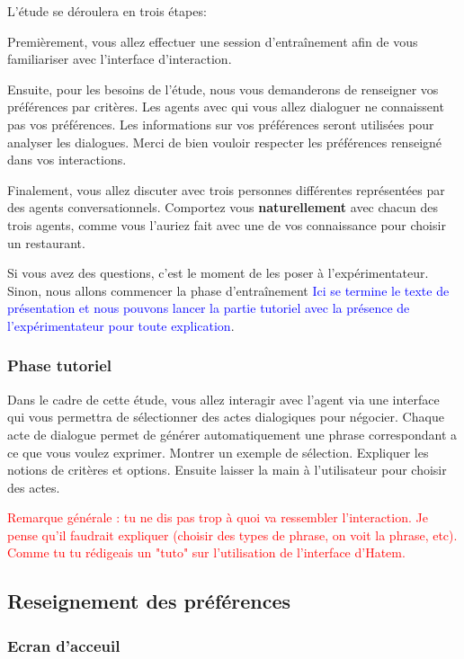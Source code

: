 \documentclass [french]{paper}
\begin{document}
				L'étude se déroulera en trois étapes:
				
				Premièrement, vous allez effectuer une session d'entraînement afin de vous familiariser avec l'interface d'interaction.
				
				Ensuite, pour les besoins de l'étude, nous vous demanderons de renseigner vos préférences par critères. Les agents avec qui vous allez dialoguer ne connaissent pas vos préférences. Les informations sur vos préférences seront utilisées pour analyser les dialogues. Merci de bien vouloir respecter les préférences renseigné dans vos interactions.
				
				Finalement, vous allez discuter avec trois personnes différentes représentées par des agents conversationnels.  Comportez vous \textbf{naturellement} avec chacun des trois agents, comme vous l'auriez fait avec une de vos connaissance pour choisir un restaurant.  
				
				
				Si vous avez des questions, c'est le moment de les poser à l'expérimentateur. Sinon, nous allons commencer la phase d'entraînement 
				\textcolor{blue}{Ici se termine le texte de présentation et nous pouvons lancer la partie tutoriel avec la présence de l'expérimentateur pour toute explication}.
				
				\subsubsection{Phase tutoriel}
				Dans le cadre de cette étude, vous allez interagir avec l'agent via une interface qui vous permettra de sélectionner des actes dialogiques pour négocier. 
				Chaque acte de dialogue permet de générer automatiquement une phrase correspondant a ce que vous voulez exprimer.
				Montrer un exemple de sélection. Expliquer les notions de critères et options. Ensuite laisser la main à l'utilisateur pour choisir des actes.  
				
				
				
				\textcolor{red}{Remarque générale : tu ne dis pas trop à quoi va ressembler l'interaction. Je pense qu'il faudrait expliquer (choisir des types de phrase, on voit la phrase, etc). Comme tu tu rédigeais un "tuto" sur l'utilisation de l'interface d'Hatem. }
				
					\subsection{Reseignement des préférences}
					\subsubsection{Ecran d'acceuil}
					
\end{document}
